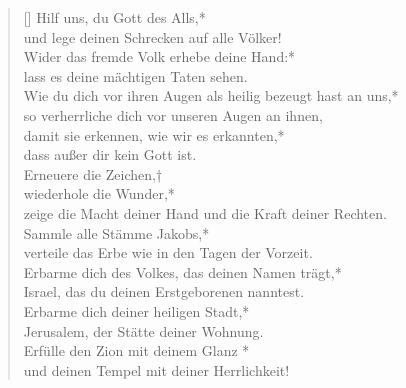 \begin{verse}[\versewidth]
 Hilf uns, du Gott des Alls,*\\
 und lege deinen Schrecken auf alle Völker!\\
\vin  Wider das fremde Volk erhebe deine Hand:*\\
 \vin lass es deine mächtigen Taten sehen.\\
Wie du dich  vor ihren Augen als heilig bezeugt hast an uns,*\\
so verherrliche dich vor unseren Augen an ihnen,\\
\vin damit sie erkennen, wie wir es erkannten,*\\
\vin dass außer dir kein Gott ist.\\
Erneuere die Zeichen,†\\
wiederhole die Wunder,*\\
zeige die Macht deiner Hand und die Kraft deiner Rechten.\\

\vin Sammle alle Stämme Jakobs,*\\
\vin verteile das Erbe wie in den Tagen der Vorzeit.\\
Erbarme dich des Volkes, das deinen Namen trägt,*\\
Israel, das du deinen Erstgeborenen nanntest.\\
\vin Erbarme dich deiner heiligen Stadt,*\\
\vin Jerusalem, der Stätte deiner Wohnung.\\
Erfülle den Zion mit deinem Glanz *\\
und deinen Tempel mit deiner Herrlichkeit! \\
\end{verse}

\vspace{0.6cm}


